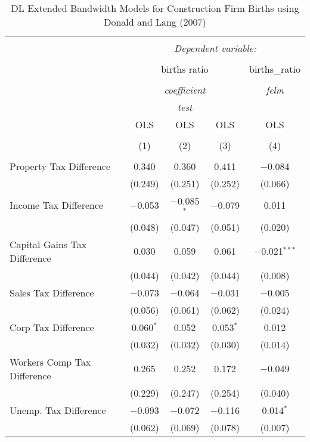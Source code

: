 
\begin{table}[!htbp] \centering 
  \caption{DL Extended Bandwidth Models for  Construction Firm Births using Donald and Lang (2007)} 
  \label{} 
\begin{tabular}{@{\extracolsep{5pt}}lcccc} 
\\[-1.8ex]\hline 
\hline \\[-1.8ex] 
 & \multicolumn{4}{c}{\textit{Dependent variable:}} \\ 
\cline{2-5} 
\\[-1.8ex] & \multicolumn{3}{c}{births ratio} & births\_ratio \\ 
\\[-1.8ex] & \multicolumn{3}{c}{\textit{coefficient}} & \textit{felm} \\ 
 & \multicolumn{3}{c}{\textit{test}} & \textit{} \\ 
 & OLS & OLS & OLS & OLS \\ 
\\[-1.8ex] & (1) & (2) & (3) & (4)\\ 
\hline \\[-1.8ex] 
 Property Tax Difference & 0.340 & 0.360 & 0.411 & $-$0.084 \\ 
  & (0.249) & (0.251) & (0.252) & (0.066) \\ 
  Income Tax Difference & $-$0.053 & $-$0.085$^{*}$ & $-$0.079 & 0.011 \\ 
  & (0.048) & (0.047) & (0.051) & (0.020) \\ 
  Capital Gains Tax Difference & 0.030 & 0.059 & 0.061 & $-$0.021$^{***}$ \\ 
  & (0.044) & (0.042) & (0.044) & (0.008) \\ 
  Sales Tax Difference & $-$0.073 & $-$0.064 & $-$0.031 & $-$0.005 \\ 
  & (0.056) & (0.061) & (0.062) & (0.024) \\ 
  Corp Tax Difference & 0.060$^{*}$ & 0.052 & 0.053$^{*}$ & 0.012 \\ 
  & (0.032) & (0.032) & (0.030) & (0.014) \\ 
  Workers Comp Tax Difference & 0.265 & 0.252 & 0.172 & $-$0.049 \\ 
  & (0.229) & (0.247) & (0.254) & (0.040) \\ 
  Unemp. Tax Difference & $-$0.093 & $-$0.072 & $-$0.116 & 0.014$^{*}$ \\ 
  & (0.062) & (0.069) & (0.078) & (0.007) \\ 

\end{tabular}
\end{table}
